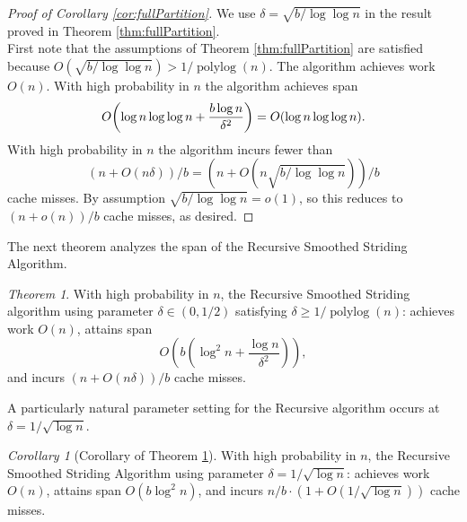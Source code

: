 \documentclass[11pt]{article}
\DeclarePairedDelimiter{\paren}{(}{)}
\newcommand{\polylog}{\operatorname{polylog}}
\theoremstyle{remark}
\newtheorem{theorem}{Theorem}[section]
\newtheorem{corollary}[thm]{Corollary}
\theoremstyle{remark}
\begin{document}
\begin{proof}[Proof of Corollary \ref{cor:fullPartition}] We use $\delta = \sqrt{b/\log\log n}$ in the result proved in Theorem \ref{thm:fullPartition}. \\
	First note that the assumptions of Theorem \ref{thm:fullPartition} are satisfied because $O(\sqrt{b/\log\log n}) > 1 / \polylog(n).$
	The algorithm achieves work $O(n)$. 
	With high probability in $n$ the algorithm achieves span 
	$$O\paren*{\log n \log\log n +\frac{b\log n}{\delta^2}} = O(\log n\log\log n).$$
	With high probability in $n$ the algorithm incurs fewer than 
	$$(n+O(n\delta))/b = (n+O(n\sqrt{b/\log\log n}))/b$$ 
	cache misses.
	By assumption $\sqrt{b/\log\log n} = o(1)$, so this reduces to 
	$(n+o(n))/b$
	cache misses, as desired.
\end{proof}



The next theorem analyzes the span of the Recursive Smoothed Striding Algorithm.
\begin{theorem}
	\label{thm:groupedPartitionAlg}
	With high probability in $n$, the Recursive Smoothed Striding
        algorithm using parameter $\delta \in(0,1/2)$ satisfying
        $\delta \ge 1 / \polylog(n)$: achieves work $O(n)$, attains span
	$$O\left(b\left(\log^2 n + \frac{\log n}{\delta^2}\right)\right),$$
	and incurs $(n+O(n \delta))/b$ cache misses. 
\end{theorem}

A particularly natural parameter setting for the Recursive algorithm occurs at $\delta = 1 / \sqrt{\log n}$.
\begin{corollary}[Corollary of Theorem \ref{thm:groupedPartitionAlg}]
  \label{cor:groupedPartitionAlg}
	With high probability in $n$, the Recursive Smoothed Striding Algorithm using parameter $\delta=1/\sqrt{\log n}$:
  achieves work $O(n)$, attains span $O(b\log^2 n)$, and incurs $n/b \cdot (1 + O(1 / \sqrt{\log n}))$ cache misses. 
\end{corollary}
\end{document}
